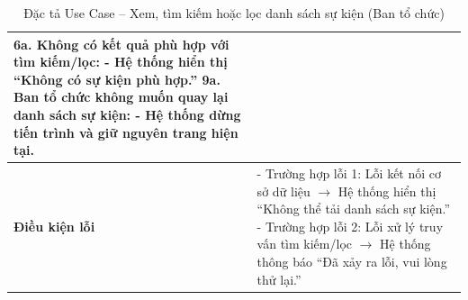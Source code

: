 \begin{table}[H]
\begin{tabularx}{\textwidth}{|l|X|}
6a. Không có kết quả phù hợp với tìm kiếm/lọc: \newline
\hspace*{1em}- Hệ thống hiển thị “Không có sự kiện phù hợp.” \newline
9a. Ban tổ chức không muốn quay lại danh sách sự kiện: \newline
\hspace*{1em}- Hệ thống dừng tiến trình và giữ nguyên trang hiện tại. \\ \hline
\textbf{Điều kiện lỗi} &
- Trường hợp lỗi 1: Lỗi kết nối cơ sở dữ liệu $\rightarrow$ Hệ thống hiển thị “Không thể tải danh sách sự kiện.” \newline
- Trường hợp lỗi 2: Lỗi xử lý truy vấn tìm kiếm/lọc $\rightarrow$ Hệ thống thông báo “Đã xảy ra lỗi, vui lòng thử lại.” \\ \hline
\end{tabularx}
\vspace{15pt}
\caption{Đặc tả Use Case -- Xem, tìm kiếm hoặc lọc danh sách sự kiện (Ban tổ chức)}
\label{tab:uc_view_search_event}
\end{table}



